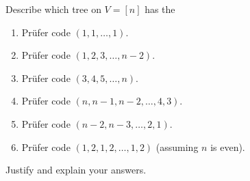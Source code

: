 \begin{exercise}
  Describe which tree on $V = [n]$  has the
  \begin{enumerate}
  \item Pr\"ufer code $(1,1,\dots,1)$.
  \item Pr\"ufer code $(1,2,3,\dots, n-2)$.
  \item Pr\"ufer code $(3,4,5,\dots, n)$.
  \item Pr\"ufer code $(n, n-1, n-2,\dots,4,3)$.
  \item Pr\"ufer code $(n-2,n-3,\dots,2,1)$.
  \item Pr\"ufer code $(1,2,1,2,\dots,1,2)$ (assuming $n$ is even).
 \end{enumerate}
 Justify and explain your answers.
\end{exercise}

